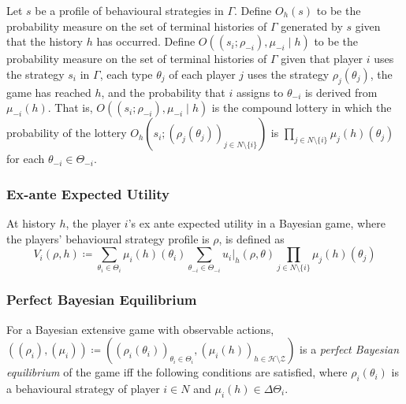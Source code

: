 \documentclass[UTF8,11pt,colorlinks,compress,openany]{beamer}%
\begin{document}
\begin{frame}\frametitle{}
Let $s$ be a profile of behavioural strategies in $\Gamma$. Define $O_h(s)$ to be the probability measure on the set of terminal histories of $\Gamma$ generated by $s$ given that the history $h$ has occurred. Define $O((s_i;\rho_{-i}),\mu_{-i}\mid h)$ to be the probability measure on the set of terminal histories of $\Gamma$ given that player $i$ uses the strategy $s_i$ in $\Gamma$, each type $\theta_j$ of each player $j$ uses the strategy $\rho_j(\theta_j)$, the game has reached $h$, and
the probability that $i$ assigns to $\theta_{-i}$ is derived from $\mu_{-i}(h)$. That is, $O((s_i;\rho_{-i}),\mu_{-i}\mid h)$ is the compound lottery in which the probability of the lottery $O_h(s_i;(\rho_j(\theta_j))_{j\in N\setminus\{i\}})$ is $\prod\limits_{j\in N\setminus\{i\}}\mu_j(h)(\theta_j)$ for each $\theta_{-i}\in\Theta_{-i}$.
\end{frame}

\begin{frame}\frametitle{Ex-ante Expected Utility}
\begin{definition}
	At history $h$, the player $i$'s ex ante expected utility in a Bayesian game, where the players' behavioural strategy profile is $\rho$, is defined as
	\[V_i(\rho,h)\coloneqq \sum\limits_{\theta_i\in\Theta_i}\mu_i(h)(\theta_i)\sum\limits_{\theta_{-i}\in\Theta_{-i}}u_i|_h(\rho,\theta)\prod\limits_{j\in N\setminus\{i\}}\mu_j(h)(\theta_j)\]
\end{definition}
\end{frame}

\begin{frame}\frametitle{Perfect Bayesian Equilibrium}
\begin{definition}
	For a Bayesian extensive game with observable actions, $((\rho_i),(\mu_i))\coloneqq ((\rho_i(\theta_i))_{\theta_i\in\Theta_i},(\mu_i(h))_{h\in\mathcal{H}\setminus\mathcal{Z}})$ is a \emph{perfect Bayesian equilibrium} of the game iff the following conditions are satisfied, where $\rho_i(\theta_i)$ is a behavioural strategy of player $i\in N$ and $\mu_i(h)\in\Delta\Theta_i$.
\end{definition}
\end{frame}
\end{document}
